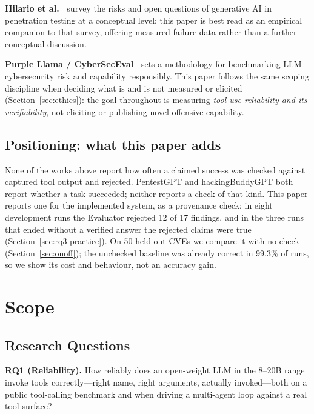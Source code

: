 \documentclass[conference]{IEEEtran}
\begin{document}
\textbf{Hilario et al.~\cite{hilario2024}} survey the risks and open
questions of generative AI in penetration testing at a conceptual level;
this paper is best read as an empirical companion to that survey, offering
measured failure data rather than a further conceptual
discussion.

\textbf{Purple Llama / CyberSecEval~\cite{purplellama}} sets a methodology
for benchmarking LLM cybersecurity risk and capability responsibly. This
paper follows the same scoping discipline when deciding what is and is not
measured or elicited (Section~\ref{sec:ethics}): the goal throughout is
measuring \emph{tool-use reliability and its verifiability}, not eliciting
or publishing novel offensive capability.

\subsection{Positioning: what this paper adds}
\label{sec:related-comparison}

None of the works above report how often a claimed success was checked
against captured tool output and rejected. PentestGPT and hackingBuddyGPT
both report whether a task succeeded; neither reports a check of that kind.
This paper reports one for the implemented system, as a provenance check:
in eight development runs the Evaluator rejected 12 of 17 findings, and in
the three runs that ended without a verified answer the rejected claims
were true (Section~\ref{sec:rq3-practice}). On 50 held-out CVEs we compare it
with no check (Section~\ref{sec:onoff}); the unchecked baseline was already
correct in 99.3\% of runs, so we show its cost and behaviour, not an accuracy gain.

\section{Scope}
\label{sec:scope}

\subsection{Research Questions}

\textbf{RQ1 (Reliability).} How reliably does an open-weight LLM in the
8--20B range invoke tools correctly---right name, right arguments, actually
invoked---both on a public tool-calling benchmark and when driving a
multi-agent loop against a real tool surface?
\end{document}
